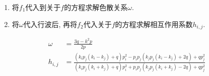 \begin{frame} 
\small
\begin{enumerate}
\item 将$f_1$代入到关于$f$的方程求解色散关系$\omega$.
\item 将$\omega$代入行波后, 再将$f_2$代入关于$f$的方程求解相互作用系数$h_{i,j}$. 
\end{enumerate}
\[
\begin{aligned}
    \omega &= \frac{3q-k^2p}{2p} \\ 
    h_{i,j}&=\frac{(k_ip_j(k_i-k_j)+q)p_i^2-p_ip_j(k_jp_j(k_i-k_j)+2q)+qp_j^2}{(k_ip_j(k_i+k_j)+q)p_i^2+p_ip_j(k_jp_j(k_i+k_j)-2q)+qp_j^2}
\end{aligned}
\]
\begin{figure}
\centering 
{}
\end{figure}
\end{frame}

